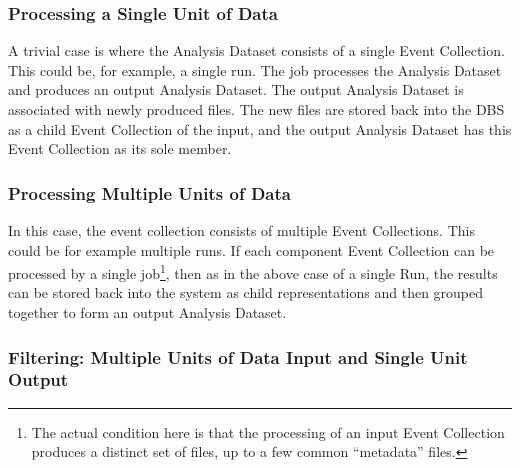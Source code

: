\documentclass{cmspaper}
\begin{document}
\subsubsection{Processing a Single Unit of Data}

A trivial case is where the Analysis Dataset consists of a single Event Collection. 
This could be, for example, a single run.  The job processes the Analysis Dataset 
and produces an output Analysis Dataset.  The output Analysis Dataset is associated 
with newly produced files.  The new files are stored back into the DBS as a child 
Event Collection of the input,  and the output Analysis Dataset has this Event Collection 
as its sole member. 

\subsubsection{Processing Multiple Units of Data}

In this case, the event collection consists of multiple Event Collections. This 
could be for example multiple runs.  If each component Event Collection can be 
processed by a single job\footnote{The actual condition here is that the processing 
of an input Event Collection produces a distinct set of files, up to a few common ``metadata'' 
files.}, then as in the above case of a single Run, the results
can be stored back into the system as child representations and then grouped
together to form an output Analysis Dataset.  

\subsubsection{Filtering: Multiple Units of Data Input and Single Unit Output}
\end{document}
